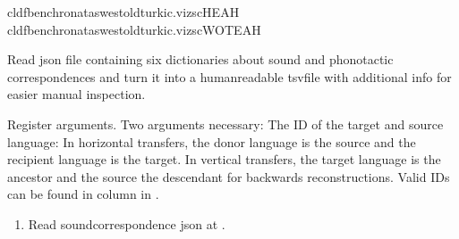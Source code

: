 \documentclass[letterpaper,10pt,english]{sphinxmanual}
\begin{document}
{{{{\begin{sphinxVerbatim}[commandchars=\\\{\}]
cldfbenchronataswestoldturkic.vizscHEAH
cldfbenchronataswestoldturkic.vizscWOTEAH
\end{sphinxVerbatim}
\label{\detokenize{mkloanpy:module-ronataswestoldturkiccommands.vizsc}}
\sphinxAtStartPar
Read json file containing six dictionaries about sound and phonotactic
correspondences and turn it into a human\sphinxhyphen{}readable tsv\sphinxhyphen{}file with additional
info for easier manual inspection.

\begin{fulllineitems}
\label{\detokenize{mkloanpy:ronataswestoldturkiccommands.vizsc.register}}
\pysigstartsignatures
{}
\pysigstopsignatures
\sphinxAtStartPar
Register arguments. Two arguments necessary: The ID of the target and
source language: In horizontal transfers, the donor language is the source
and the recipient language is the target. In vertical transfers, the
target language is the ancestor and the source the descendant for backwards
reconstructions. Valid IDs can be found in
column  in .

\end{fulllineitems}


\begin{fulllineitems}
\label{\detokenize{mkloanpy:ronataswestoldturkiccommands.vizsc.run}}
\pysigstartsignatures
{}
\pysigstopsignatures\begin{enumerate}
%
\item {} 
\sphinxAtStartPar
Read sound\sphinxhyphen{}correspondence json at .


\end{enumerate}
\end{fulllineitems}}}}}
\end{document}
